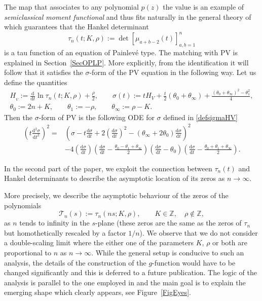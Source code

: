 \documentclass[10pt,a4paper]{amsart}
\numberwithin{equation}{section}
\theoremstyle{definition}
\def\le{\left}
\def\ri{\right}
\def \d{{\mathrm d}}
\def\be{\begin{equation}}
\def\ee{\end{equation}}
\def\Z{{\mathbb Z}}
\def\s{\sigma}
\begin{document}
The map that associates to any polynomial $p(z)$ the value \smash{$\mathcal M[p]:= \oint_{|z|=R} p(z) \d \mu(z)$} is an example of {\it semiclassical moment functional} \cite{Marcellan0, Marcellan, Maroni, Shohat} and thus fits naturally in the general theory of \cite{Bertola:Semiiso} which guarantees that the Hankel determinant
\[
\tau_n(t; {K}, {\rho} ):= \det \le[\mu_{a+b-2}(t)\ri]_{a,b=1}^n
\]
is a tau function of an equation of Painlev\'e type. The matching with PV is explained in Section~\ref{SecOPLP}.
More explicitly, from the identification it will follow that it satisfies the $\sigma$-form of the PV equation \cite[Appendix~C]{JMU2} in the following way. Let us define the quantities
\begin{gather}%
H_{_V}:= \frac {\d}{\d t} \ln \tau_n(t; {K}, {\rho} ) + \frac {\rho} 2,
\qquad
 \s(t) := t H_V + \frac t 2 (\theta_0 + \theta_\infty) + \frac { (\theta_0 + \theta_\infty)^2 - \theta_1^2}4,\nonumber
 \\
\theta_0 :=2n + { {K}}, \qquad
\theta_1 := - { {\rho}},\qquad
\theta_\infty:={ {\rho}} - { {K}}.\label{defsigmaHV}
\end{gather}
Then the $\sigma$-form of PV is the following ODE for $\sigma$ defined in \eqref{defsigmaHV}
\begin{align*}%
\le(t \frac {\d^2 \s}{\d t^2}\ri)^2 ={}& \le(
 \s - t\frac {\d \s}{\d t} + 2\le(\frac {\d \s}{\d t}\ri)^2 - (\theta_\infty + 2\theta_0) \frac {\d \s}{\d t}
 \ri)^2 \nonumber\\
 &- 4 \le(\frac {\d \s}{\d t}\ri)
 \le(\frac {\d \s}{\d t} - \frac { \theta_0 -\theta_1 + \theta_\infty}2 \ri)
 \le( \frac {\d \s}{\d t} - \theta_0 \ri)
 \le(\frac {\d \s}{\d t} - \frac { \theta_0 + \theta_1 + \theta_\infty}2 \ri).
 \end{align*}

In the second part of the paper, we exploit the connection between $\tau_n(t)$ and Hankel determinants to describe the asymptotic location of its zeros as $n\to\infty$.

More precisely, we describe the asymptotic behaviour of the zeros of the polynomials
\be
\mathcal T_n(s):=
\tau_n(ns; {K}, {\rho} ), \qquad {K}\in \Z,\quad {\rho}\not\in \Z,
\label{Pns}
\ee
as $n$ tends to infinity in the $s$-plane (these zeros are the same as the zeros of $\tau_n$ but homothetically rescaled by a factor $1/n$).
We observe that we do not consider a double-scaling limit where the either one of the parameters ${K}$, ${\rho}$ or both are proportional to $n$ as $n\to\infty$. While the general setup is conducive to such an analysis, the details of the construction of the $g$-function would have to be changed significantly and this is deferred to a future publication. The logic of the analysis is parallel to the one employed in \cite{BalBerBo,BertolaBothner} and
the main goal is to explain the emerging shape which clearly appears, see Figure~\ref{FigEyes}.
\end{document}
